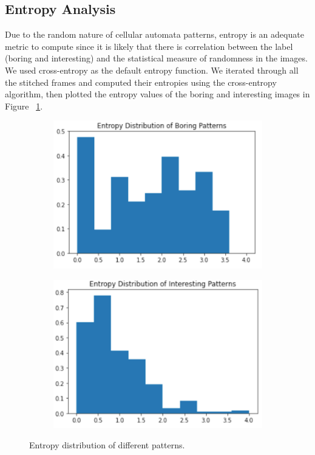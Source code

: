 \documentclass[12pt]{article}
\numberwithin{figure}{section} %
\begin{document}
\subsection{Entropy Analysis}
Due to the random nature of cellular automata patterns, entropy is an adequate metric to compute since it is likely that there is correlation between the label (boring and interesting) and the statistical measure of randomness in the images. We used cross-entropy as the default entropy function. We iterated through all the stitched frames and computed their entropies using the cross-entropy algorithm, then plotted the entropy values of the boring and interesting images in Figure ~\ref{fig:entropy distribution}. 
\begin{figure}[H]
\begin{subfigure}{0.5 \textwidth}
\centering
\includegraphics[width=\linewidth]{Section3/4.1}
\end{subfigure}
\begin{subfigure}{0.5 \textwidth}
\centering
\includegraphics[width=\linewidth]{Section3/4.2}
\end{subfigure}
\caption[Entropy distribution of patterns]{Entropy distribution of different patterns.}
\label{fig:entropy distribution}
\vspace{-1.5em}
\end{figure}
\end{document}
